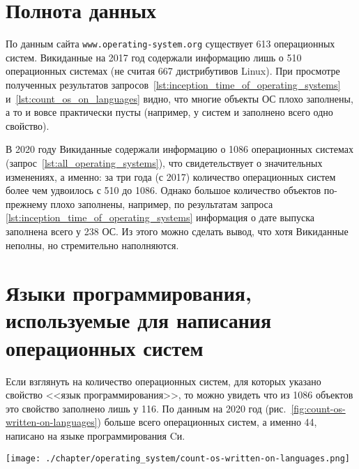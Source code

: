 \section{Полнота данных}
По данным сайта \verb|www.operating-system.org| существует 613 операционных систем\autocite{list_operating_systems}. 
Викиданные на 2017 год содержали информацию лишь о 510 операционных системах 
(не считая \num{667} дистрибутивов Linux\autocite{list_operating_systems}). 
При просмотре полученных результатов 
запросов~\ref{lst:inception_time_of_operating_systems} и~\ref{lst:count_os_on_languages} видно, 
что многие объекты ОС плохо заполнены, а то и вовсе практически пусты 
(например, у систем  и  заполнено всего одно свойство\autocite{prowd_os_link}).

В 2020 году Викиданные содержали информацию о 1086 операционных системах 
(запрос~\ref{lst:all_operating_systems}), что свидетельствует о значительных изменениях, 
а именно: за три года (с 2017) количество операционных систем более чем удвоилось с 510 до 1086. 
Однако большое количество объектов по-прежнему плохо заполнены, 
например, по результатам запроса \ref{lst:inception_time_of_operating_systems} 
информация о дате выпуска заполнена всего у \num{238} ОС. 
Из этого можно сделать вывод, что хотя Викиданные неполны, но стремительно наполняются.


\section{Языки программирования, используемые для написания операционных систем}

Если взглянуть на количество операционных систем, для которых указано свойство <<язык программирования>>, то можно увидеть что из \num{1086} объектов это свойство заполнено лишь у \num{116}. По данным на 2020 год (рис.~\ref{fig:count-os-written-on-languages}) больше всего операционных систем, а именно 44, написано на языке программирования Cи.

\begin{figure*}[h!]
	\texttt{[image: ./chapter/operating\_system/count-os-written-on-languages.png]}
    \caption[Первые языки, на которых написано больше всего ОС, 2020 год.]{Первые восемь языков, на которых написано больше всего операционных систем, 2020 год.}
	\label{fig:count-os-written-on-languages}
\end{figure*}


